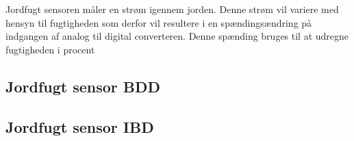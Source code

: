 
Jordfugt sensoren måler en strøm igennem jorden. Denne strøm vil variere med hensyn til fugtigheden som derfor vil resultere i en spændingsændring på indgangen af analog til digital converteren. Denne spænding bruges til at udregne fugtigheden i procent

\subsection{Jordfugt sensor BDD}



\subsection{Jordfugt sensor IBD}

